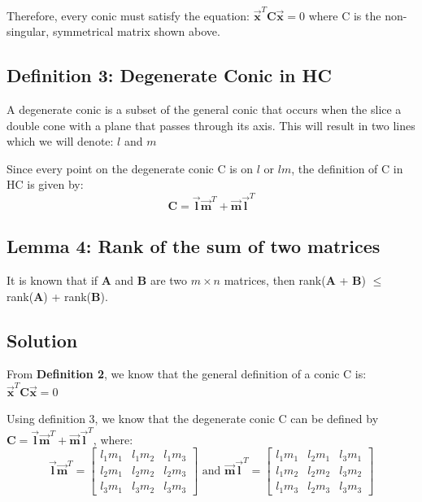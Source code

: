 \documentclass{article}
\begin{document}
Therefore, every conic must satisfy the equation: \(\boldsymbol{\Vec{x}}^T \boldsymbol{C} \boldsymbol{\Vec{x}} = 0\) where C is the non-singular, symmetrical matrix shown above.

\subsection*{Definition 3: Degenerate Conic in HC}
A degenerate conic is a subset of the general conic that occurs when the slice a double cone with a plane that passes through its axis. This will result in two lines which we will denote: $l$ and $m$

Since every point on the degenerate conic C is on $l$ or $lm$, the definition of C in HC is given by:
\[\boldsymbol{C} = \boldsymbol{\Vec{l}} \boldsymbol{\Vec{m}}^T + \boldsymbol{\Vec{m}} \boldsymbol{\Vec{l}}^T\]

\subsection*{Lemma 4: Rank of the sum of two matrices}
It is known that if \textbf{A} and \textbf{B} are two $m \times n$ matrices, then rank(\textbf{A} + \textbf{B}) $\leq$ rank(\textbf{A}) + rank(\textbf{B}).


\subsection*{Solution}
From \textbf{Definition 2}, we know that the general definition of a conic C is: \(\boldsymbol{\Vec{x}}^T \boldsymbol{C} \boldsymbol{\Vec{x}} = 0\)

Using definition 3, we know that the degenerate conic C can be defined by \(\boldsymbol{C} = \boldsymbol{\Vec{l}} \boldsymbol{\Vec{m}}^T + \boldsymbol{\Vec{m}} \boldsymbol{\Vec{l}}^T\), where:
\[\boldsymbol{\Vec{l}} \boldsymbol{\Vec{m}}^T = \begin{bmatrix}
    l_1m_1 & l_1m_2 & l_1m_3 \\
    l_2m_1 & l_2m_2 & l_2m_3 \\
    l_3m_1 & l_3m_2 & l_3m_3 
\end{bmatrix} \text{ and } \boldsymbol{\Vec{m}} \boldsymbol{\Vec{l}}^T  = \begin{bmatrix}
    l_1m_1 & l_2m_1 & l_3m_1 \\
    l_1m_2 & l_2m_2 & l_3m_2 \\
    l_1m_3 & l_2m_3 & l_3m_3
\end{bmatrix}\]
\end{document}

